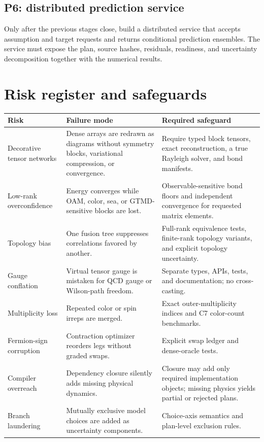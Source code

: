 \documentclass[11pt]{article}
\begin{document}
\subsection{P6: distributed prediction service}

Only after the previous stages close, build a distributed service that accepts
assumption and target requests and returns conditional prediction ensembles.
The service must expose the plan, source hashes, residuals, readiness, and
uncertainty decomposition together with the numerical results.

\section{Risk register and safeguards}
\label{sec:risks}

\begin{longtable}{L{0.22\textwidth}L{0.34\textwidth}L{0.35\textwidth}}
\toprule
Risk & Failure mode & Required safeguard\\
\midrule
\endhead
Decorative tensor networks & Dense arrays are redrawn as diagrams without symmetry blocks, variational compression, or convergence. & Require typed block tensors, exact reconstruction, a true Rayleigh solver, and bond manifests.\\
Low-rank overconfidence & Energy converges while OAM, color, sea, or GTMD-sensitive blocks are lost. & Observable-sensitive bond floors and independent convergence for requested matrix elements.\\
Topology bias & One fusion tree suppresses correlations favored by another. & Full-rank equivalence tests, finite-rank topology variants, and explicit topology uncertainty.\\
Gauge conflation & Virtual tensor gauge is mistaken for QCD gauge or Wilson-path freedom. & Separate types, APIs, tests, and documentation; no cross-casting.\\
Multiplicity loss & Repeated color or spin irreps are merged. & Exact outer-multiplicity indices and C7 color-count benchmarks.\\
Fermion-sign corruption & Contraction optimizer reorders legs without graded swaps. & Explicit swap ledger and dense-oracle tests.\\
Compiler overreach & Dependency closure silently adds missing physical dynamics. & Closure may add only required implementation objects; missing physics yields partial or rejected plans.\\
Branch laundering & Mutually exclusive model choices are added as uncertainty components. & Choice-axis semantics and plan-level exclusion rules.\\

\end{longtable}
\end{document}
